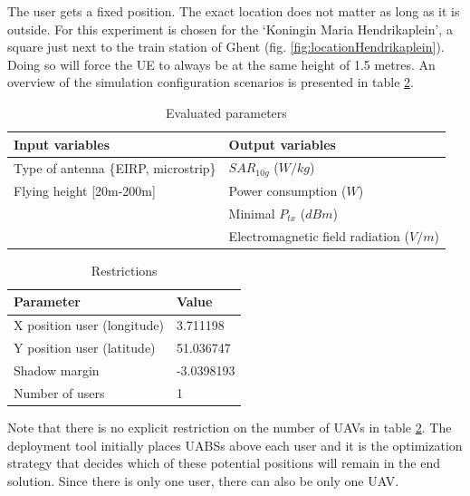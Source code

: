 The user gets a fixed position. The exact location does not matter as long as it is outside. For this experiment is chosen for the 
`Koningin Maria Hendrikaplein', a square just next to the train station of Ghent (fig. \ref{fig:locationHendrikaplein}).  Doing so will force the \gls{UE} 
to always be at the same height of 1.5 metres. 
An overview of the simulation configuration scenarios is presented in table \ref{table:S1:restrictions}.
\newline
\begin{table}[!htb]
\centering
            \begin{tabular}{|m{8cm}|m{7cm}|}
            \hline
            \textbf{Input variables  }                    & \textbf{Output variables}          \\   \hline 
            Type of antenna \{EIRP, microstrip\}            & $SAR_{10g}$  ($W/kg$)            \\ 
            Flying height [20m-200m]                        & Power consumption  ($W$)           \\ 
                                                          &  Minimal $P_{tx}$ ($dBm$)\\ 
                                                          & Electromagnetic field radiation ($V/m$)\\
            \hline
            \end{tabular} 
            \caption{Evaluated parameters}
          \label{table:s1:evalpara}
\end{table}
\begin{table}[!htb]
\centering
        \begin{tabular}{|m{8cm}|m{7cm}|}
        \hline
        \textbf{Parameter}              & \textbf{Value}          \\   \hline 
        X position user (longitude)              & 3.711198       \\    
        Y position user (latitude)               & 51.036747          \\ 
        Shadow margin             & -3.0398193 \\
        Number of users                & 1 \\
        \hline
        \end{tabular}
        \caption{Restrictions}
        \label{table:S1:restrictions}
\end{table}


Note that there is no explicit restriction on the number of \gls{UAV}s in table \ref{table:S1:restrictions}. The deployment tool initially places 
\gls{UABS}s above each user and it is the optimization strategy that decides which of these potential positions will remain in the end solution.
Since there is only one user, there can also be only one \gls{UAV}.





